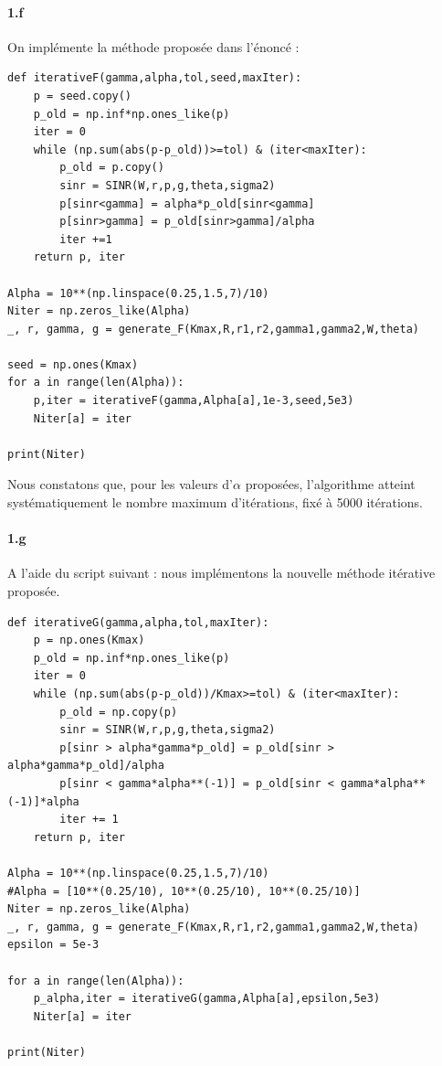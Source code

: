 \documentclass[a4paper,11pt,2]{article}
\begin{document}
\paragraph{1.f} On implémente la méthode proposée dans l'énoncé :
\begin{center}
\begin{lstlisting}
def iterativeF(gamma,alpha,tol,seed,maxIter):
    p = seed.copy()
    p_old = np.inf*np.ones_like(p)
    iter = 0
    while (np.sum(abs(p-p_old))>=tol) & (iter<maxIter):
        p_old = p.copy()
        sinr = SINR(W,r,p,g,theta,sigma2)
        p[sinr<gamma] = alpha*p_old[sinr<gamma]
        p[sinr>gamma] = p_old[sinr>gamma]/alpha
        iter +=1
    return p, iter

Alpha = 10**(np.linspace(0.25,1.5,7)/10)
Niter = np.zeros_like(Alpha)
_, r, gamma, g = generate_F(Kmax,R,r1,r2,gamma1,gamma2,W,theta)

seed = np.ones(Kmax)
for a in range(len(Alpha)):
    p,iter = iterativeF(gamma,Alpha[a],1e-3,seed,5e3)
    Niter[a] = iter

print(Niter)
\end{lstlisting}
\end{center}

Nous constatons que, pour les valeurs d'$\alpha$ proposées, l'algorithme atteint systématiquement le nombre maximum d'itérations, fixé à 5000 itérations.

\paragraph{1.g} A l'aide du script suivant : nous implémentons la nouvelle méthode itérative proposée.
\begin{center}
\begin{lstlisting}
def iterativeG(gamma,alpha,tol,maxIter):
    p = np.ones(Kmax)
    p_old = np.inf*np.ones_like(p)
    iter = 0
    while (np.sum(abs(p-p_old))/Kmax>=tol) & (iter<maxIter):
        p_old = np.copy(p)
        sinr = SINR(W,r,p,g,theta,sigma2)
        p[sinr > alpha*gamma*p_old] = p_old[sinr > alpha*gamma*p_old]/alpha
        p[sinr < gamma*alpha**(-1)] = p_old[sinr < gamma*alpha**(-1)]*alpha
        iter += 1
    return p, iter

Alpha = 10**(np.linspace(0.25,1.5,7)/10)
#Alpha = [10**(0.25/10), 10**(0.25/10), 10**(0.25/10)]
Niter = np.zeros_like(Alpha)
_, r, gamma, g = generate_F(Kmax,R,r1,r2,gamma1,gamma2,W,theta)
epsilon = 5e-3

for a in range(len(Alpha)):
    p_alpha,iter = iterativeG(gamma,Alpha[a],epsilon,5e3)
    Niter[a] = iter

print(Niter)
\end{lstlisting}
\end{center}
\end{document}
